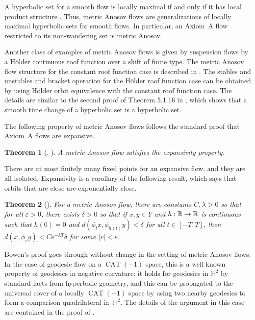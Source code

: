 \documentclass[JEP,XML,SOM,Unicode,NoFloatCountersInSection]{cedram}
\let\epsilon\varepsilon
\newtheorem{thm}{Theorem}[section]
\theoremstyle{definition}
\numberwithin{equation}{section}
\newcommand\R{\ifmmode{\mathbb R}\else{$\mathbb R$}\fi}
\DeclareMathOperator{\CAT}{CAT}
\begin{document}
A hyperbolic set for a smooth flow is locally maximal if and only if it has local product structure \cite[Th.\,6.2.7]{FH}. Thus, metric Anosov flows are generalizations of locally maximal hyperbolic sets for smooth flows. In particular, an Axiom~A flow restricted to its non-wandering set is metric Anosov.

Another class of examples of metric Anosov flows is given by suspension flows by a Hölder continuous roof function over a shift of finite type. The metric Anosov flow structure for the constant roof function case is described in \cite{pollicott}. The stables and unstables and bracket operation for the Hölder roof function case can be obtained by using Hölder orbit equivalence with the constant roof function case. The details are similar to the second proof of Theorem 5.1.16 in \cite[\S6.1]{FH}, which shows that a smooth time change of a hyperbolic set is a hyperbolic set.

The following property of metric Anosov flows follows the standard proof that Axiom~A flows are expansive.
\begin{thm}[{\cite[Cor.\,1.6]{bowen-symbolic}, \cite[Prop.\,1]{pollicott}}]
A metric Anosov flow satisfies the expansivity property.
\end{thm}
There are at most finitely many fixed points for an expansive flow, and they are all isolated. Expansivity is a corollary of the following result, which says that orbits that are close are exponentially close.

\begin{thm}[{\cite[Lem.\,1.5]{bowen-symbolic}}]\label{expclose}
For a metric Anosov flow, there are constants $C, \lambda>0$ so that for all $\epsilon>0$, there exists $\delta>0$ so that if $x,y \in Y$ and \hbox{$h: \R \to \R$} is continuous such that $h(0)=0$ and $d(\phi_t x, \phi_{h(t)} y) < \delta$ for all $t \in [-T, T]$, then $d(x, \phi_v y)< C e^{-\lambda T}\delta$ for some $|v| < \epsilon$.
\end{thm}

Bowen's proof goes through without change in the setting of metric Anosov flows. In the case of geodesic flow on a $\CAT(-1)$ space, this is a well known property of geodesics in negative curvature: it holds for geodesics in $\mathbb{H}^2$ by standard facts from hyperbolic geometry, and this can be propagated to the universal cover of a locally $\CAT(-1)$ space by using two nearby geodesics to form a comparison quadrilateral in~$\mathbb{H}^2$. The details of the argument in this case are contained in the proof of \cite[Prop.\,4.3]{CLT}.
\end{document}
